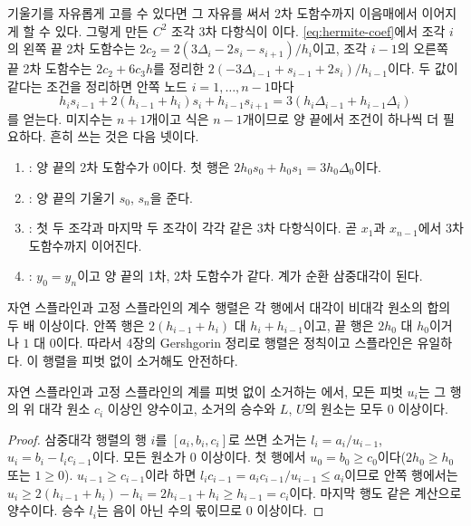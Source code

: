 기울기를 자유롭게 고를 수 있다면 그 자유를 써서 2차 도함수까지 이음매에서 이어지게 할 수 있다. 그렇게 만든 $C^2$ 조각 3차 다항식이 이다. \eqref{eq:hermite-coef}에서 조각 $i$의 왼쪽 끝 2차 도함수는 $2c_2=2(3\Delta_i-2s_i-s_{i+1})/h_i$이고, 조각 $i-1$의 오른쪽 끝 2차 도함수는 $2c_2+6c_3h$를 정리한 $2(-3\Delta_{i-1}+s_{i-1}+2s_i)/h_{i-1}$이다. 두 값이 같다는 조건을 정리하면 안쪽 노드 $i=1,\dots,n-1$마다
\begin{equation}
\label{eq:spline-system}
h_is_{i-1}+2(h_{i-1}+h_i)s_i+h_{i-1}s_{i+1}=3(h_i\Delta_{i-1}+h_{i-1}\Delta_i)
\end{equation}
를 얻는다. 미지수는 $n+1$개이고 식은 $n-1$개이므로 양 끝에서 조건이 하나씩 더 필요하다. 흔히 쓰는 것은 다음 넷이다.
\begin{enumerate}
\item {}: 양 끝의 2차 도함수가 $0$이다. 첫 행은 $2h_0s_0+h_0s_1=3h_0\Delta_0$이다.
\item {}: 양 끝의 기울기 $s_0$, $s_n$을 준다.
\item {}: 첫 두 조각과 마지막 두 조각이 각각 같은 3차 다항식이다. 곧 $x_1$과 $x_{n-1}$에서 3차 도함수까지 이어진다.
\item {}: $y_0=y_n$이고 양 끝의 1차, 2차 도함수가 같다. 계가 순환 삼중대각이 된다.
\end{enumerate}

자연 스플라인과 고정 스플라인의 계수 행렬은 각 행에서 대각이 비대각 원소의 합의 두 배 이상이다. 안쪽 행은 $2(h_{i-1}+h_i)$ 대 $h_i+h_{i-1}$이고, 끝 행은 $2h_0$ 대 $h_0$이거나 $1$ 대 $0$이다. 따라서 4장의 Gershgorin 정리로 행렬은 정칙이고 스플라인은 유일하다. 이 행렬을 피벗 없이 소거해도 안전하다.

\begin{proposition}
\label{prop:thomas-positive}
자연 스플라인과 고정 스플라인의 계를 피벗 없이 소거하는 에서, 모든 피벗 $u_i$는 그 행의 위 대각 원소 $c_i$ 이상인 양수이고, 소거의 승수와 $L$, $U$의 원소는 모두 $0$ 이상이다.
\end{proposition}

\begin{proof}
삼중대각 행렬의 행 $i$를 $[a_i,b_i,c_i]$로 쓰면 소거는 $l_i=a_i/u_{i-1}$, $u_i=b_i-l_ic_{i-1}$이다. 모든 원소가 $0$ 이상이다. 첫 행에서 $u_0=b_0\ge c_0$이다($2h_0\ge h_0$ 또는 $1\ge0$). $u_{i-1}\ge c_{i-1}$이라 하면 $l_ic_{i-1}=a_ic_{i-1}/u_{i-1}\le a_i$이므로 안쪽 행에서는 $u_i\ge2(h_{i-1}+h_i)-h_i=2h_{i-1}+h_i\ge h_{i-1}=c_i$이다. 마지막 행도 같은 계산으로 양수이다. 승수 $l_i$는 음이 아닌 수의 몫이므로 $0$ 이상이다.
\end{proof}

